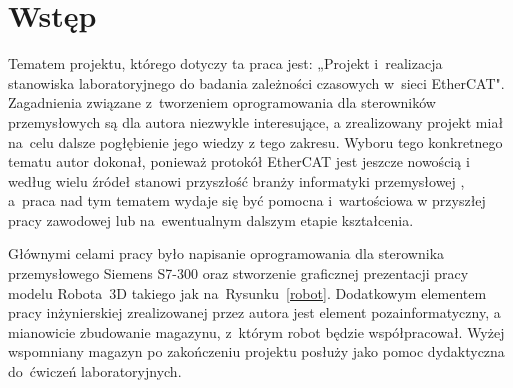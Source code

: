 \section{Wstęp}

Tematem projektu, którego dotyczy ta praca jest: „Projekt i~realizacja stanowiska laboratoryjnego do badania zależności czasowych w~sieci EtherCAT". Zagadnienia związane z~tworzeniem oprogramowania dla sterowników przemysłowych są dla autora niezwykle interesujące, a zrealizowany projekt miał na~celu dalsze pogłębienie jego wiedzy z tego zakresu. Wyboru tego konkretnego tematu autor dokonał, ponieważ protokół EtherCAT jest jeszcze nowością i według wielu źródeł stanowi przyszłość branży informatyki przemysłowej \cite{art1, art2}, a~praca nad tym tematem wydaje się być pomocna i~wartościowa w przyszłej pracy zawodowej lub na~ewentualnym dalszym etapie kształcenia.

Głównymi celami pracy było napisanie oprogramowania dla sterownika przemysłowego Siemens S7-300 oraz stworzenie graficznej prezentacji pracy modelu Robota~3D takiego jak na~Rysunku~\ref{robot}.
Dodatkowym elementem pracy inżynierskiej zrealizowanej przez autora jest element pozainformatyczny, a mianowicie zbudowanie magazynu, z~którym robot będzie współpracował. Wyżej wspomniany magazyn po zakończeniu projektu posłuży jako pomoc dydaktyczna do~ćwiczeń laboratoryjnych.

